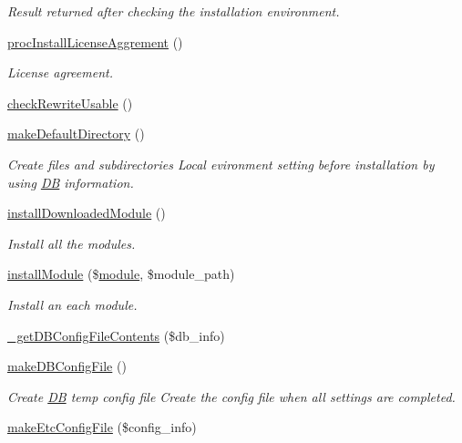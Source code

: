 \begin{DoxyCompactItemize}
\begin{DoxyCompactList}\small\item\em Result returned after checking the installation environment. \end{DoxyCompactList}\item 
\hyperlink{classinstallController_a432aa2b801ee6ac5aaf11dd0a6678590}{proc\-Install\-License\-Aggrement} ()
\begin{DoxyCompactList}\small\item\em License agreement. \end{DoxyCompactList}\item 
\hyperlink{classinstallController_ae621886c36c43926d81f6beb56cfde25}{check\-Rewrite\-Usable} ()
\item 
\hyperlink{classinstallController_a5503f7ef0615cbd6b11a6ef4ae13c2c9}{make\-Default\-Directory} ()
\begin{DoxyCompactList}\small\item\em Create files and subdirectories Local evironment setting before installation by using \hyperlink{classDB}{D\-B} information. \end{DoxyCompactList}\item 
\hyperlink{classinstallController_ad7919cd4745794ee4f57db53e8105190}{install\-Downloaded\-Module} ()
\begin{DoxyCompactList}\small\item\em Install all the modules. \end{DoxyCompactList}\item 
\hyperlink{classinstallController_a97c582da1e115f0db5256f02d22efc88}{install\-Module} (\$\hyperlink{classmodule}{module}, \$module\-\_\-path)
\begin{DoxyCompactList}\small\item\em Install an each module. \end{DoxyCompactList}\item 
\hyperlink{classinstallController_a49b453dda367ff1ce7ef2455974f36a5}{\-\_\-get\-D\-B\-Config\-File\-Contents} (\$db\-\_\-info)
\item 
\hyperlink{classinstallController_a65277eeb03f9762ae58dab7570e5310c}{make\-D\-B\-Config\-File} ()
\begin{DoxyCompactList}\small\item\em Create \hyperlink{classDB}{D\-B} temp config file Create the config file when all settings are completed. \end{DoxyCompactList}\item 
\hyperlink{classinstallController_a87b331e263614e15c5366284648f6ee0}{make\-Etc\-Config\-File} (\$config\-\_\-info)

\end{DoxyCompactItemize}
